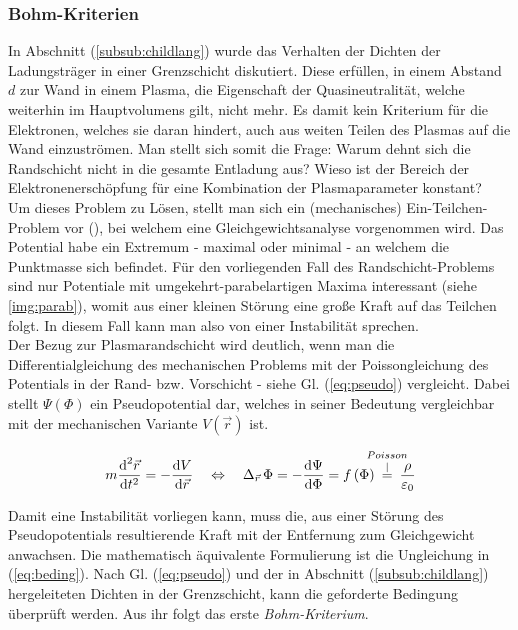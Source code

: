 \documentclass[numbers=noenddot,a4paper]{scrartcl}
\newcommand{\diff}{\textnormal{d}}
\newcommand{\ix}[1]{_\text{#1}}
\newcommand{\tilt}[1]{\textit{#1}}
\begin{document}
		\subsubsection{Bohm-Kriterien}

			In Abschnitt (\ref{subsub:childlang}) wurde das Verhalten der Dichten der Ladungstr\"ager in einer Grenzschicht diskutiert. Diese erf\"ullen, in einem Abstand $d$ zur Wand in einem Plasma, die Eigenschaft der Quasineutralit\"at, welche weiterhin im Hauptvolumens gilt, nicht mehr. Es damit kein Kriterium f\"ur die Elektronen, welches sie daran hindert, auch aus weiten Teilen des Plasmas auf die Wand einzustr\"omen. Man stellt sich somit die Frage: Warum dehnt sich die Randschicht nicht in die gesamte Entladung aus? Wieso ist der Bereich der Elektronenersch\"opfung f\"ur eine Kombination der Plasmaparameter konstant? \\
			Um dieses Problem zu L\"osen, stellt man sich ein (mechanisches) Ein-Teilchen-Problem vor (\cite{Piel10}), bei welchem eine Gleichgewichtsanalyse vorgenommen wird. Das Potential habe ein Extremum - maximal oder minimal - an welchem die Punktmasse sich befindet. F\"ur den vorliegenden Fall des Randschicht-Problems sind nur Potentiale mit umgekehrt-parabelartigen Maxima interessant (siehe \ref{img:parab}), womit aus einer kleinen St\"orung eine gro{\ss}e Kraft auf das Teilchen folgt. In diesem Fall kann man also von einer Instabilit\"at sprechen.\\
			Der Bezug zur Plasmarandschicht wird deutlich, wenn man die Differentialgleichung des mechanischen Problems mit der Poissongleichung des Potentials in der Rand- bzw. Vorschicht - siehe Gl. (\ref{eq:pseudo}) vergleicht. Dabei stellt $\Psi\left(\Phi\right)$ ein Pseudopotential dar, welches in seiner Bedeutung vergleichbar mit der mechanischen Variante $V\left(\vec{r}\right)$ ist.

				\begin{align}
					m\frac{\diff^{2}\vec{r}}{\diff t^{2}}=-\frac{\diff V}{\diff\vec{r}} \quad \Leftrightarrow \quad \Delta_{\vec{r}}\,\Phi=-\frac{\diff\Psi}{\diff\Phi}=f\left(\Phi\right)\hspace{-0.3cm}\overset{Poisson}{\overset{\mid}{=}}\hspace{-0.3cm}\frac{\rho}{\varepsilon\ix{0}} \label{eq:pseudo}
				\end{align}

			Damit eine Instabilit\"at vorliegen kann, muss die, aus einer St\"orung des Pseudopotentials resultierende Kraft mit der Entfernung zum Gleichgewicht anwachsen. Die mathematisch \"aquivalente Formulierung ist die Ungleichung  in (\ref{eq:beding}). Nach Gl. (\ref{eq:pseudo}) und der in Abschnitt (\ref{subsub:childlang}) hergeleiteten Dichten in der Grenzschicht, kann die geforderte Bedingung \"uberpr\"uft werden. Aus ihr folgt das erste \tilt{Bohm-Kriterium}.
\end{document}
